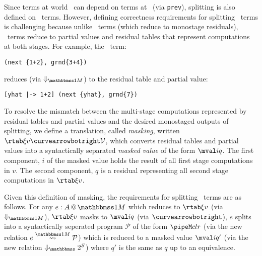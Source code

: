\begin{abstrsyn}
Since terms at world \bbtwo\ can depend on terms at \bbonem\ (via \texttt{prev}), splitting is also defined on 
\bbonem\ terms.
However, defining correctness requirements for splitting \bbonem\ terms is
challenging because unlike \bbtwo\ terms (which reduce to monostage
residuals), \bbonem\ terms reduce to partial values and
residual tables that represent computations at both stages.
For example, the \bbonem\ term:
\begin{lstlisting}
(next {1+2}, grnd{3+4})
\end{lstlisting}
reduces (via $\redonesym$) to the residual table and partial value:
\begin{lstlisting}
[yhat |-> 1+2] (next {yhat}, grnd{7})
\end{lstlisting}

To resolve the mismatch between the multi-stage computations
represented by residual tables and partial values and the desired monostaged
outputs of splitting,
we define a translation, called {\em masking}, written $\rtab \xi v \vsplito \mathcal{V}$,
which converts residual tables and partial values into a syntactically separated {\em masked value} of the form $\mval i q$.
The first component, $i$ of the masked value holds the result of all
first stage computations in $v$.  The second component, $q$ is a
residual representing all second stage computations in $\rtab \xi v$.



Given this definition of masking, the requirements for splitting
\bbonem\ terms are as follows. For any $\colmix e A$ which reduces to
$\rtab \xi v$ (via $\redonesym$), $\rtab \xi v$ masks to $\mval i q$
(via $\vsplito$), $e$ splits into a syntactically seperated program
$\mathcal{P}$ of the form $\pipeM c l r$ (via the new relation $e
\splitonesym \mathcal{P}$) which is reduced to a masked value $\mval i
{q'}$ (via the new relation $\sepredtwosym$) where $q'$ is the same as
$q$ up to an equivalence.


\end{abstrsyn}
